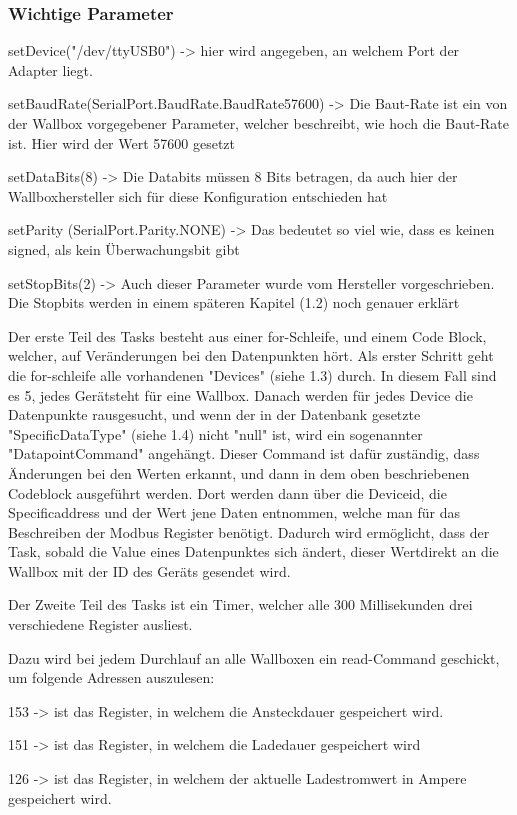 \subsubsection*{Wichtige Parameter}


\begin{compactitem}
  \item setDevice("/dev/ttyUSB0") -> hier wird angegeben, an welchem Port der Adapter liegt. 
  \item setBaudRate(SerialPort.BaudRate.BaudRate57600)  -> Die Baut-Rate ist ein von der Wallbox vorgegebener Parameter, welcher beschreibt, wie hoch die Baut-Rate ist. Hier wird der Wert 57600 gesetzt
  \item setDataBits(8) -> Die Databits müssen 8 Bits betragen, da auch hier der Wallboxhersteller sich für diese Konfiguration entschieden hat
  \item setParity (SerialPort.Parity.NONE) -> Das bedeutet so viel wie, dass es keinen signed, als kein Überwachungsbit gibt 
  \item setStopBits(2) -> Auch dieser Parameter wurde vom Hersteller vorgeschrieben. Die Stopbits werden in einem späteren Kapitel (1.2) noch genauer erklärt
\end{compactitem}

Der erste Teil des Tasks besteht aus einer for-Schleife, und einem Code Block, welcher, auf Veränderungen bei den Datenpunkten hört. Als erster Schritt geht die for-schleife alle vorhandenen "Devices" (siehe 1.3) durch. In diesem Fall sind es 5, jedes Gerätsteht für eine Wallbox. Danach werden für jedes Device die Datenpunkte rausgesucht, und wenn der in der Datenbank gesetzte "SpecificDataType" (siehe 1.4) nicht "null" ist, wird ein sogenannter "DatapointCommand" angehängt. Dieser Command ist dafür zuständig, dass Änderungen bei den Werten erkannt, und dann in dem oben beschriebenen Codeblock ausgeführt werden. Dort werden dann über die Deviceid, die Specificaddress und der Wert jene Daten entnommen, welche man für das Beschreiben der Modbus Register benötigt. Dadurch wird ermöglicht, dass der Task, sobald die Value eines Datenpunktes sich ändert, dieser Wertdirekt an die Wallbox mit der ID des Geräts gesendet wird. 

Der Zweite Teil des Tasks ist ein Timer, welcher alle 300 Millisekunden drei verschiedene Register ausliest. 

Dazu wird bei jedem Durchlauf an alle Wallboxen ein read-Command geschickt, um folgende Adressen auszulesen: 

\begin{compactitem}
  \item 153 -> ist das Register, in welchem die Ansteckdauer gespeichert wird. 
  \item 151 -> ist das Register, in welchem die Ladedauer gespeichert wird 
  \item 126 -> ist das Register, in welchem der aktuelle Ladestromwert in Ampere gespeichert wird.
\end{compactitem}

